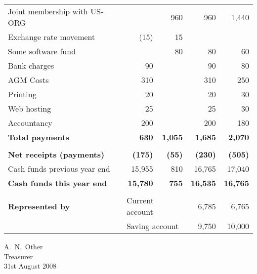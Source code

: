 \documentclass[12pt,a4paper]{article}
\begin{document}
\begin{tabular}{lr|r|r||r}
Joint membership with US-ORG &      & 960 & 960 & 1,440 \\
Exchange rate movement       & (15) & 15  &     &       \\
Some software fund           &      & 80  &  80 &    60 \\
Bank charges                 &   90 &     &  90 &    80 \\
AGM Costs                    &  310 &     & 310 &   250 \\
Printing                     &   20 &     &  20 &    30 \\
Web hosting                  &   25 &     &  25 &    30 \\
Accountancy                  &  200 &     & 200 &   180 \\

\textbf{Total payments}      & \textbf{630} & \textbf{1,055} 
  & \textbf{1,685} & \textbf{2,070} \\[1ex]
  
\\[1ex]

\textbf{Net receipts (payments)} & \textbf{(175)} & \textbf{(55)} 
  & \textbf{(230)} & \textbf{(505)} \\[2ex]
  
Cash funds previous year end & 15,955 & 810 & 16,765 & 17,040 \\[1ex]

\textbf{Cash funds this year end} & \textbf{15,780} & \textbf{755} 
& \textbf{16,535} & \textbf{16,765} \\

\\[2ex]

\textbf{Represented by}
 &  \multicolumn{2}{l}{Current account} & 6,785 &  6,765 \\
 &  \multicolumn{2}{l}{Saving account } & 9,750 & 10,000 \\

\end{tabular}

\vspace{2cm}

\begin{flushright}
A.~N.~Other      \\
Treasurer        \\
31st August 2008 \\
\end{flushright}
\end{document}
